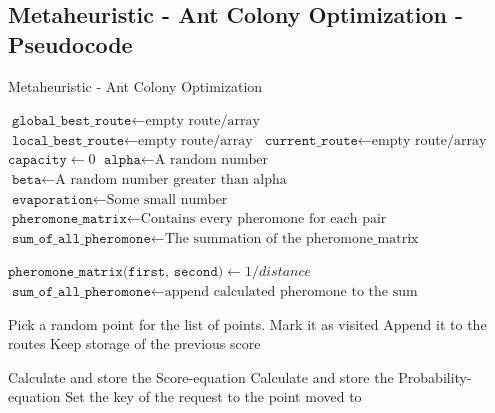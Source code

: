 \documentclass[12pt]{article}
\newcommand{\var}{\texttt}
\begin{document}
\begin{appendices}

    \section{Metaheuristic - Ant Colony Optimization - Pseudocode}
    \begin{algorithm}[!ht]
        \caption{Metaheuristic - Ant Colony Optimization}
        \begin{algorithmic}[1]
            \State $\var{global\_best\_route} \gets \text{empty route/array}$
                    \State $\var{local\_best\_route} \gets \text{empty route/array}$
                    \State $\var{current\_route} \gets \text{empty route/array}$
                    \State $\var{capacity} \gets 0$
                    \State $\var{alpha} \gets \text{A random number}$
                    \State $\var{beta} \gets \text{A random number greater than alpha}$
                    \State $\var{evaporation} \gets \text{Some small number}$
                    \State $\var{pheromone\_matrix} \gets \text{Contains every pheromone for each pair}$
                    \State $\var{sum\_of\_all\_pheromone} \gets \text{The summation of the pheromone\_matrix}$
                    
                                \State $\var{pheromone\_matrix(first, second)} \gets 1 / distance$
                                \State $\var{sum\_of\_all\_pheromone} \gets \text{append calculated pheromone to the sum}$
                            \EndIf
                        \EndFor
                    \EndFor
    
                    \State Pick a random point for the list of points. 
                    \State Mark it as visited
                    \State Append it to the routes
                    \State Keep storage of the previous score
    
                            \State Calculate and store the Score-equation
                            \State Calculate and store the Probability-equation
                                \State Set the key of the request to the point moved to
    

\end{algorithmic}
\end{algorithm}
\end{appendices}
\end{document}
